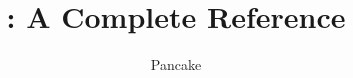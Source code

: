 \documentclass[openany, 12pt, b5paper]{memoir}
\begin{document}
\title{\langname : A Complete Reference}
\author{Pancake}
\frontmatter
\maketitle
\newpage
\begin{KeepFromToc}
  \tableofcontents
\end{KeepFromToc}
\mainmatter






% 
\backmatter
\end{document}
